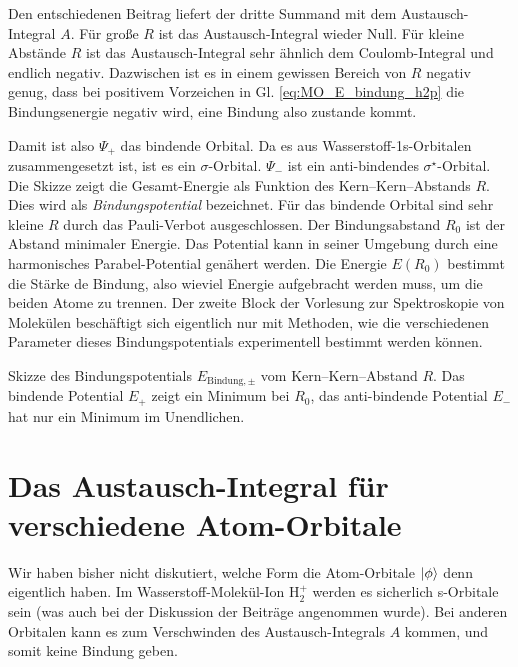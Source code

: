 Den entschiedenen Beitrag liefert der dritte Summand mit dem Austausch-Integral $A$. Für große $R$ ist das Austausch-Integral wieder Null. Für kleine Abstände $R$ ist das Austausch-Integral sehr ähnlich dem Coulomb-Integral und endlich negativ. Dazwischen ist es in einem gewissen Bereich von $R$ negativ genug, dass bei positivem Vorzeichen in Gl. \ref{eq:MO_E_bindung_h2p} die Bindungsenergie negativ wird, eine Bindung also zustande kommt.

Damit ist also $\Psi_+$ das bindende Orbital. Da es aus Wasserstoff-1s-Orbitalen zusammengesetzt ist, ist es ein $\sigma$-Orbital. $\Psi_-$ ist ein anti-bindendes $\sigma^\star$-Orbital. Die Skizze zeigt die Gesamt-Energie als Funktion des Kern--Kern--Abstands $R$. Dies wird als \emph{Bindungspotential} bezeichnet. Für das bindende Orbital sind sehr kleine $R$ durch das Pauli-Verbot ausgeschlossen.
Der Bindungsabstand $R_0$ ist der Abstand minimaler Energie. Das Potential kann in seiner Umgebung durch eine harmonisches Parabel-Potential genähert werden. Die Energie $E(R_0)$ bestimmt die Stärke de Bindung, also wieviel Energie aufgebracht werden muss, um die beiden Atome zu trennen. Der zweite Block der Vorlesung zur Spektroskopie von Molekülen beschäftigt sich eigentlich nur mit Methoden, wie die verschiedenen Parameter dieses Bindungspotentials experimentell bestimmt werden können.



\begin{marginfigure}

\caption{Skizze des Bindungspotentials $E_{\text{Bindung}, \pm}$ vom Kern--Kern--Abstand $R$. Das bindende Potential $E_+$ zeigt ein Minimum bei $R_0$, das anti-bindende Potential $E_-$ hat nur ein Minimum im Unendlichen.}
\end{marginfigure}



\section{Das Austausch-Integral für verschiedene Atom-Orbitale}

Wir haben bisher nicht diskutiert, welche Form die Atom-Orbitale $\ket{\phi}$ denn eigentlich haben.
Im Wasserstoff-Molekül-Ion H$_2^+$ werden es sicherlich s-Orbitale sein (was auch bei der Diskussion der Beiträge angenommen wurde). Bei anderen Orbitalen kann es zum Verschwinden des Austausch-Integrals $A$ kommen, und somit keine Bindung geben.

